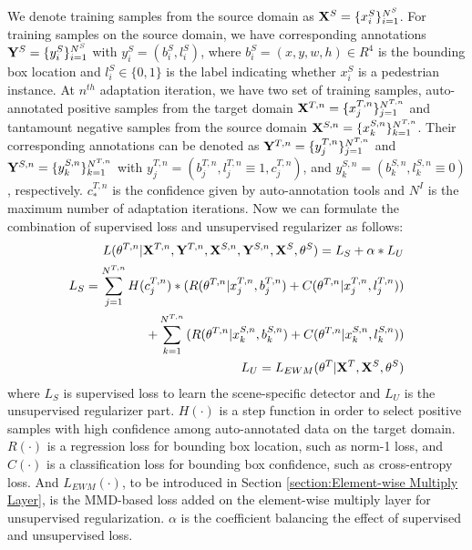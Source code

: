 \documentclass[runningheads]{llncs}
\begin{document}
We denote training samples from the source domain as ${\bf X}^{S} = \{x^{S}_{i}\}^{N^{S}}_{i=1}$. For training samples on the source domain, we have corresponding annotations ${\bf Y}^{S} = \{y^{S}_{i}\}^{N^{S}}_{i=1}$ with $y^{S}_{i} = (b^{S}_{i},l^{S}_{i})$, where $b^{S}_{i} = (x,y,w,h) \in R^{4}$ is the bounding box location and $l^{S}_{i} \in \{0,1\}$ is the label indicating whether $x^{S}_{i}$ is a pedestrian instance. At $n^{th}$ adaptation iteration, we have two set of training samples, auto-annotated positive samples from the target domain ${\bf X}^{T,n} = \{x^{T,n}_{j}\}^{N^{T,n}}_{j=1}$ and tantamount negative samples from the source domain ${\bf X}^{S,n} = \{x^{S,n}_{k}\}^{N^{T,n}}_{k=1}$. Their corresponding annotations can be denoted as ${\bf Y}^{T,n} = \{y^{T,n}_{j}\}^{N^{T,n}}_{j=1}$ and ${\bf Y}^{S,n} = \{y^{S,n}_{k}\}^{N^{T,n}}_{k=1}$ with $y^{T,n}_{j} = (b^{T,n}_{j},l^{T,n}_{j}\equiv1,c^{T,n}_{j})$, and $y^{S,n}_{k} = (b^{S,n}_{k},l^{S,n}_{k}\equiv0)$, respectively. $c^{T,n}_{*}$ is the confidence given by auto-annotation tools and $N^{I}$ is the maximum number of adaptation iterations. Now we can formulate the combination of supervised loss and unsupervised regularizer as follows:
\begin{eqnarray}
  L(\theta^{T,n}|{\bf X}^{T,n},{\bf Y}^{T,n},{\bf X}^{S,n},{\bf Y}^{S,n},{\bf X}^{S},\theta^{S}) = L_{S} + \alpha * L_{U} \\
 \nonumber  L_{S} = \sum^{N^{T,n}}_{j=1}{H(c^{T,n}_{j})* ( R(\theta^{T,n}|x^{T,n}_{j},b^{T,n}_{j})+C(\theta^{T,n}|x^{T,n}_{j},l^{T,n}_{j}) )} \\
             + \sum^{N^{T,n}}_{k=1}{( R(\theta^{T,n}|x^{S,n}_{k},b^{S,n}_{k})+C(\theta^{T,n}|x^{S,n}_{k},l^{S,n}_{k}) )}\\
  L_{U} = L_{EWM}(\theta^{T}|{\bf X}^{T},{\bf X}^{S},\theta^{S}) \label{Eq:lmmd}
\end{eqnarray}
where $L_{S}$ is supervised loss to learn the scene-specific detector and $L_{U}$ is the unsupervised regularizer part. $H(\cdot)$ is a step function in order to select positive samples with high confidence among auto-annotated data on the target domain. $R(\cdot)$ is a regression loss for bounding box location, such as norm-1 loss, and $C(\cdot)$ is a classification loss for bounding box confidence, such as cross-entropy loss. And $L_{EWM}(\cdot)$, to be introduced in Section \ref{section:Element-wise Multiply Layer}, is the MMD-based loss added on the element-wise multiply layer for unsupervised regularization. $\alpha$ is the coefficient balancing the effect of supervised and unsupervised loss.
\end{document}
